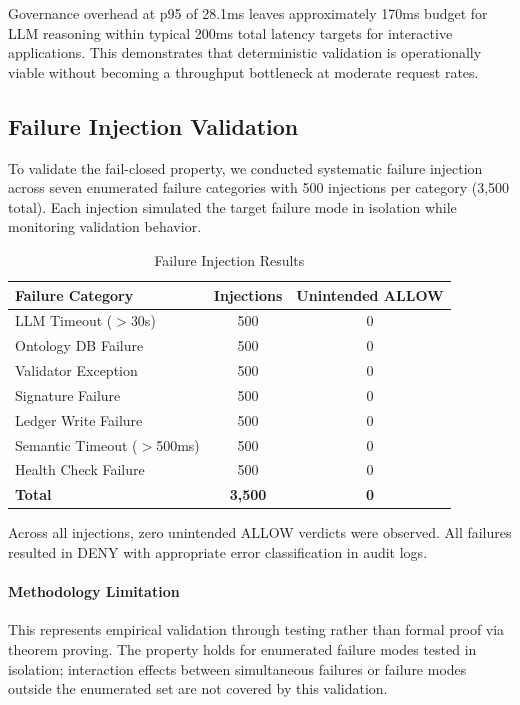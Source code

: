 \documentclass[sigconf,nonacm]{acmart}
\begin{document}
Governance overhead at p95 of 28.1ms leaves approximately 170ms budget for LLM reasoning within typical 200ms total latency targets for interactive applications. This demonstrates that deterministic validation is operationally viable without becoming a throughput bottleneck at moderate request rates.

\subsection{Failure Injection Validation}

To validate the fail-closed property, we conducted systematic failure injection across seven enumerated failure categories with 500 injections per category (3,500 total). Each injection simulated the target failure mode in isolation while monitoring validation behavior.

\begin{table}[htbp]
\caption{Failure Injection Results}
\label{tab:failures}
\begin{tabular}{@{}lcc@{}}
\toprule
\textbf{Failure Category} & \textbf{Injections} & \textbf{Unintended ALLOW} \\
\midrule
LLM Timeout ($>$30s) & 500 & 0 \\
Ontology DB Failure & 500 & 0 \\
Validator Exception & 500 & 0 \\
Signature Failure & 500 & 0 \\
Ledger Write Failure & 500 & 0 \\
Semantic Timeout ($>$500ms) & 500 & 0 \\
Health Check Failure & 500 & 0 \\
\midrule
\textbf{Total} & \textbf{3,500} & \textbf{0} \\
\bottomrule
\end{tabular}
\end{table}

Across all injections, zero unintended ALLOW verdicts were observed. All failures resulted in DENY with appropriate error classification in audit logs.

\paragraph{Methodology Limitation} This represents empirical validation through testing rather than formal proof via theorem proving. The property holds for enumerated failure modes tested in isolation; interaction effects between simultaneous failures or failure modes outside the enumerated set are not covered by this validation.
\end{document}
